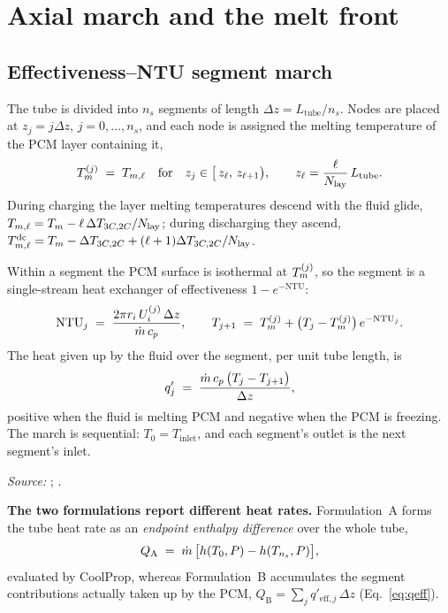 \section{Axial march and the melt front}
\label{sec:front}

\subsection{Effectiveness--NTU segment march}
\label{sec:front:march}

The tube is divided into $n_{s}$ segments of length $\Delta z =
L_{\mathrm{tube}}/n_{s}$. Nodes are placed at $z_{j}=j\Delta z$, $j=0,\dots,n_s$,
and each node is assigned the melting temperature of the PCM layer containing
it,
\begin{equation}
  T_{m}^{(j)} \;=\; T_{m,\ell}
  \quad\text{for}\quad
  z_{j} \in \bigl[\,z_{\ell},\, z_{\ell+1}\bigr),
  \qquad
  z_{\ell} = \frac{\ell}{N_{\mathrm{lay}}}\,L_{\mathrm{tube}} .
\end{equation}
During charging the layer melting temperatures descend with the fluid glide,
$T_{m,\ell}=T_{m} - \ell\,\Delta T_{3C,2C}/N_{\mathrm{lay}}$; during discharging
they ascend, $T_{m,\ell}^{\mathrm{dc}}=T_{m} - \Delta T_{3C,2C} +
(\ell+1)\Delta T_{3C,2C}/N_{\mathrm{lay}}$.

Within a segment the PCM surface is isothermal at $T_{m}^{(j)}$, so the segment is
a single-stream heat exchanger of effectiveness $1-e^{-\mathrm{NTU}}$:
\begin{equation}
  \mathrm{NTU}_{j}
  \;=\;
  \frac{2\pi r_{i}\,U_{i}^{(j)}\,\Delta z}{\dot m\,c_{p}},
  \qquad
  T_{j+1}
  \;=\;
  T_{m}^{(j)} + \bigl(T_{j}-T_{m}^{(j)}\bigr)\,e^{-\mathrm{NTU}_{j}} .
  \label{eq:ntu}
\end{equation}
The heat given up by the fluid over the segment, per unit tube length, is
\begin{equation}
  q'_{j} \;=\; \frac{\dot m\,c_{p}\,\bigl(T_{j}-T_{j+1}\bigr)}{\Delta z},
  \label{eq:qprime}
\end{equation}
positive when the fluid is melting PCM and negative when the PCM is freezing.
The march is sequential: $T_{0}=T_{\mathrm{inlet}}$, and each segment's outlet is
the next segment's inlet.

\emph{Source:} ;
.

\medskip
\noindent\textbf{The two formulations report different heat rates.}
Formulation~A forms the tube heat rate as an \emph{endpoint enthalpy
difference} over the whole tube,
\begin{equation}
  Q_{\mathrm{A}} \;=\; \dot m\,\bigl[h(T_{0},P) - h(T_{n_{s}},P)\bigr],
  \label{eq:Q-endpoint}
\end{equation}
evaluated by CoolProp, whereas Formulation~B accumulates the segment
contributions actually taken up by the PCM,
$Q_{\mathrm{B}} = \sum_{j} q'_{\mathrm{eff},j}\,\Delta z$
(Eq.~\eqref{eq:qeff}).

